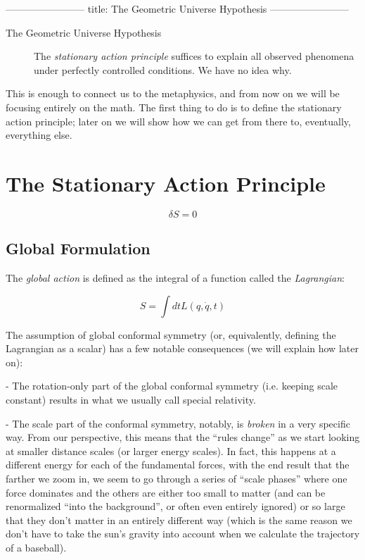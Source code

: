 ------------------------
title: The Geometric Universe Hypothesis
------------------------

\begin{description}
  \item[The Geometric Universe Hypothesis] The \emph{stationary action principle} suffices to explain all observed phenomena under perfectly controlled conditions. We have no idea why.
\end{description}

This is enough to connect us to the metaphysics, and from now on we will be focusing entirely on the math. The first thing to do is to define the stationary action principle; later on we will show how we can get from there to, eventually, everything else.

\section{The Stationary Action Principle}

\[\delta S = 0\]

\subsection{Global Formulation}

The \emph{global action} is defined as the integral of a function called the \emph{Lagrangian}:

\[ S = \int dt L(q, \dot q, t) \]

The assumption of global conformal symmetry (or, equivalently, defining the Lagrangian as a scalar) has a few notable consequences (we will explain how later on):

- The rotation-only part of the global conformal symmetry (i.e. keeping scale constant) results in what we usually call special relativity.

- The scale part of the conformal symmetry, notably, is \emph{broken} in a very specific way. From our perspective, this means that the ``rules change'' as we start looking at smaller distance scales (or larger energy scales). In fact, this happens at a different energy for each of the fundamental forces, with the end result that the farther we zoom in, we seem to go through a series of ``scale phases'' where one force dominates and the others are either too small to matter (and can be renormalized ``into the background'', or often even entirely ignored) or so large that they don't matter in an entirely different way (which is the same reason we don't have to take the sun's gravity into account when we calculate the trajectory of a baseball).

